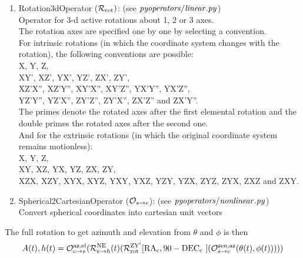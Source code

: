\documentclass[a4paper, 11pt]{article}
\def\ba{\begin{eqnarray}}
\def\ea{\end{eqnarray}}
\begin{document}
\begin{enumerate}
\item Rotation3dOperator  (${\cal R}_{\rm rot})$: (see $\it{pyoperators/linear.py }$) \\
Operator for 3-d active rotations about 1, 2 or 3 axes. \\
The rotation axes are specified one by one by selecting a convention. \\
For intrinsic rotations (in which the coordinate system changes with the rotation), the following conventions are possible: \\
X, Y, Z, \\
 XY', XZ', YX', YZ', ZX', ZY', \\
 XZ'X'', XZ'Y'', XY'X'', XY'Z'',  YX'Y'', YX'Z'', \\
YZ'Y'', YZ'X'', ZY'Z'', ZY'X'', ZX'Z'' and ZX'Y''. \\
The primes denote the rotated axes after the first elemental rotation and the double primes the rotated axes after the second one. \\
And for the extrinsic rotations (in which the original coordinate system remains motionless): \\
 X, Y, Z, \\
XY, XZ, YX, YZ, ZX, ZY,  \\
 XZX, XZY, XYX, XYZ, YXY, YXZ, YZY, YZX, ZYZ, ZYX, ZXZ and ZXY. 
\item Spherical2CartesianOperator  (${\cal O}_{s \rightarrow c} $):  (see $\it{pyoperators/nonlinear.py }$) \\
 Convert spherical coordinates into  cartesian unit vectors 
\end{enumerate}
The full rotation to get azimuth and elevation from $\theta$ and $\phi$ is then 
\ba
A(t),h(t)=   {\cal O}^{\rm az,el}_{c \rightarrow s} ({\cal R}^{\rm NE}_{e \rightarrow h} (t) ({\cal R}^{\rm Z  Y'}_{\rm rot} [ {\rm RA_{c}, 90- DEC_{c} }] ({\cal O}^{\rm zen, az}_{s \rightarrow c} (\theta(t),\phi (t)))))
\ea
\end{document}
